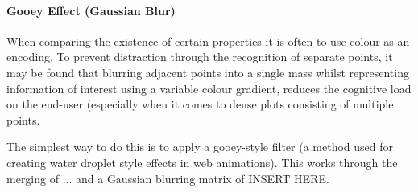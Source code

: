 \paragraph{Gooey Effect (Gaussian Blur)}
When comparing the existence of certain properties it is often to use colour as an encoding. To prevent distraction through the recognition of separate points, it may be found that blurring adjacent points into a single mass whilst representing information of interest using a variable colour gradient, reduces the cognitive load on the end-user (especially when it comes to dense plots consisting of multiple points.

The simplest way to do this is to apply a gooey-style filter (a method used for creating water droplet style effects in web animations). This works through the merging of ... and a Gaussian blurring matrix of INSERT HERE.
